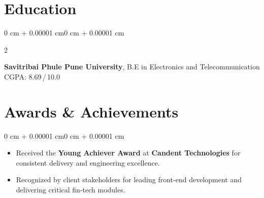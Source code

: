 \documentclass[10pt, letterpaper]{article}
\newenvironment{highlights}{
    \begin{itemize}[
        topsep=0.10 cm,
        parsep=0.10 cm,
        partopsep=0pt,
        itemsep=0pt,
        leftmargin=0 cm + 10pt
    ]
}{\end{itemize}}
\newenvironment{onecolentry}{
    \begin{adjustwidth}{0 cm + 0.00001 cm}{0 cm + 0.00001 cm}
}{\end{adjustwidth}}
\newenvironment{twocolentry}[2][]{
    \onecolentry
    \def\secondColumn{#2}
    \setcolumnwidth{\fill, 4.5 cm}
    \begin{paracol}{2}
}{
    \switchcolumn \raggedleft \secondColumn
    \end{paracol}
    \endonecolentry
}
\begin{document}
    \section{Education}

    \begin{twocolentry}{2022}
        \textbf{Savitribai Phule Pune University},
        B.E in Electronics and Telecommunication \quad CGPA: 8.69\,/\,10.0
    \end{twocolentry}
    
    \section{Awards \& Achievements}

    \begin{onecolentry}
        \begin{highlights}
            \item Received the \textbf{Young Achiever Award} at \textbf{Candent Technologies}
            for consistent delivery and engineering excellence.
            \item Recognized by client stakeholders for leading front-end development and
            delivering critical fin-tech modules.
        \end{highlights}
    \end{onecolentry}
\end{document}
